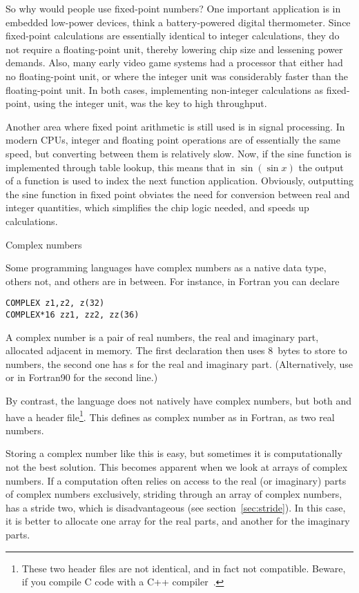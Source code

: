 So why would people use fixed-point numbers? One important application
is in embedded low-power devices, think a battery-powered digital
thermometer. Since fixed-point calculations are essentially identical
to integer calculations, they do not require a floating-point unit,
thereby lowering chip size and lessening power demands. Also, many
early video game systems had a processor that either had no
floating-point unit, or where the integer unit was considerably faster
than the floating-point unit. In both cases, implementing non-integer
calculations as fixed-point, using the integer unit, was the key to
high throughput. 

Another area where fixed point arithmetic is still used is in signal
processing. In modern CPUs, integer and floating point operations
are of essentially the same speed, but converting between them is
relatively slow. Now, if the sine function is implemented through
table lookup, this means that in $\sin(\sin x)$ 
the output of a function is used to index the next function
application. Obviously, outputting the sine function in fixed point
obviates the need for conversion between real and integer quantities,
which simplifies the chip logic needed, and speeds up calculations.

 {Complex numbers}
\label{sec:complex}

Some programming languages have complex numbers as a native data type,
others not, and others are in between. For instance, in Fortran you
can declare
\begin{verbatim}
COMPLEX z1,z2, z(32)
COMPLEX*16 zz1, zz2, zz(36)
\end{verbatim}
A complex number is a pair of real numbers, the real and imaginary
part, allocated adjacent in memory. The first declaration then uses
8~bytes to store to  numbers, the second one has s
for the real and imaginary part.  (Alternatively, use  or in Fortran90  for the second line.)

By contrast, the  language does not natively have complex
numbers, but both  and  have a  header
file\footnote {These two header files are not identical, and in fact
  not compatible. Beware, if you compile C code with a C++
  compiler~\cite{DobbsComplex}.}. This defines as complex number as in
Fortran, as two real numbers.

Storing a complex number like this is easy, but sometimes it is
computationally not the best solution. This becomes apparent when we
look at arrays of complex numbers.
If a computation often relies
on access to the real (or imaginary) parts of complex numbers
exclusively, striding through an array of complex numbers, has a
stride two, which is disadvantageous (see
section~\ref{sec:stride}). In this case, it is better to allocate one
array for the real parts, and another for the imaginary parts.

